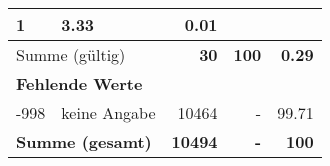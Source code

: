 \begin{longtable}{lXrrr}
       \num{1} &
       \num[round-mode=places,round-precision=2]{3,33} &
         \num[round-mode=places,round-precision=2]{0,01} \\
     \midrule
     \multicolumn{2}{l}{Summe (gültig)} &
       \textbf{\num{30}} &
     \textbf{100} &
       \textbf{\num[round-mode=places,round-precision=2]{0,29}} \\
     \multicolumn{5}{l}{\textbf{Fehlende Werte}}\\
       -998 &
       keine Angabe &
         \num{10464} &
        - &
         \num[round-mode=places,round-precision=2]{99,71} \\
     \midrule
     \multicolumn{2}{l}{\textbf{Summe (gesamt)}} &
          \textbf{\num{10494}} &
        \textbf{-} &
        \textbf{100} \\
     \bottomrule
     \end{longtable}
     
